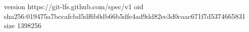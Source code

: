 version https://git-lfs.github.com/spec/v1
oid sha256:019475a7bccafcbd5df6b0db66b5dfe4ad9dd82ec3d0caac671f7d5374665831
size 1398256
